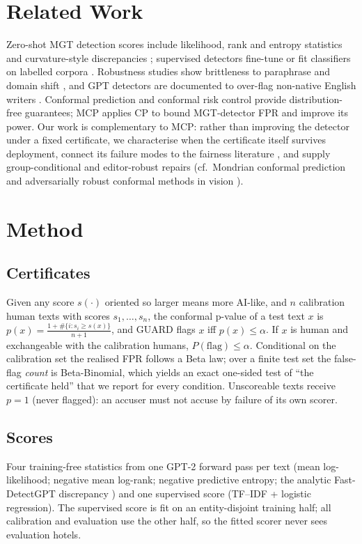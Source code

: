 \documentclass[11pt]{article}
\begin{document}
\section{Related Work}
Zero-shot MGT detection scores include likelihood, rank and entropy statistics \cite{gltr,solaiman} and curvature-style discrepancies \cite{detectgpt,fastdetectgpt}; supervised detectors fine-tune or fit classifiers on labelled corpora \cite{roberta}. Robustness studies show brittleness to paraphrase and domain shift \cite{raid,krishna,sadasivan}, and GPT detectors are documented to over-flag non-native English writers \cite{liang}. Conformal prediction \cite{vovk,papadopoulos} and conformal risk control \cite{angelopoulos} provide distribution-free guarantees; MCP \cite{mcp} applies CP to bound MGT-detector FPR and improve its power. Our work is complementary to MCP: rather than improving the detector under a fixed certificate, we characterise when the certificate itself survives deployment, connect its failure modes to the fairness literature \cite{liang}, and supply group-conditional and editor-robust repairs (cf.\ Mondrian conformal prediction \cite{vovk} and adversarially robust conformal methods in vision \cite{gendler}).
\section{Method}
\subsection{Certificates}
Given any score $s(\cdot)$ oriented so larger means more AI-like, and $n$ calibration human texts with scores $s_1,\dots,s_n$, the conformal p-value of a test text $x$ is $p(x) = \frac{1+\#\{i: s_i \ge s(x)\}}{n+1}$, and GUARD flags $x$ iff $p(x)\le\alpha$. If $x$ is human and exchangeable with the calibration humans, $P(\mathrm{flag})\le\alpha$. Conditional on the calibration set the realised FPR follows a Beta law; over a finite test set the false-flag \emph{count} is Beta-Binomial, which yields an exact one-sided test of ``the certificate held'' that we report for every condition. Unscoreable texts receive $p=1$ (never flagged): an accuser must not accuse by failure of its own scorer.
\subsection{Scores}
Four training-free statistics from one GPT-2 forward pass per text (mean log-likelihood; negative mean log-rank; negative predictive entropy; the analytic Fast-DetectGPT discrepancy \cite{fastdetectgpt}) and one supervised score (TF--IDF + logistic regression). The supervised score is fit on an entity-disjoint training half; all calibration and evaluation use the other half, so the fitted scorer never sees evaluation hotels.
\end{document}
